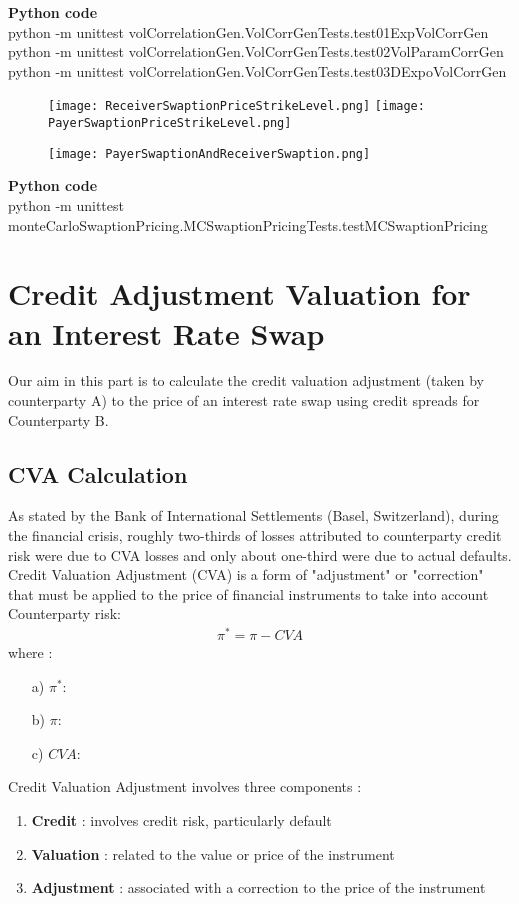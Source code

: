 \documentclass[11pt]{article}
\numberwithin{equation}{subsection}
\begin{document}
\textbf{Python code}\\
python -m unittest volCorrelationGen.VolCorrGenTests.test01ExpVolCorrGen\\
python -m unittest volCorrelationGen.VolCorrGenTests.test02VolParamCorrGen\\
python -m unittest volCorrelationGen.VolCorrGenTests.test03DExpoVolCorrGen

\begin{figure}[H]
	\texttt{[image: ReceiverSwaptionPriceStrikeLevel.png]}
	\texttt{[image: PayerSwaptionPriceStrikeLevel.png]}
\end{figure}


\begin{figure}[H]
	\texttt{[image: PayerSwaptionAndReceiverSwaption.png]}
\end{figure}

\textbf{Python code} \\
python -m unittest monteCarloSwaptionPricing.MCSwaptionPricingTests.testMCSwaptionPricing

\newpage
\section{Credit Adjustment Valuation for an Interest Rate Swap}
Our aim in this part is to calculate the credit valuation adjustment (taken by counterparty
A) to the price of an interest rate swap using credit spreads for Counterparty B.

\subsection{CVA Calculation}
As stated by the Bank of International Settlements (Basel, Switzerland), during the financial crisis, roughly two-thirds of losses attributed to counterparty credit risk were due to CVA losses and only about one-third were due to actual defaults.
Credit Valuation Adjustment (CVA) is a form of "adjustment" or "correction" that must be applied to the price of financial instruments to take into account Counterparty risk:
\begin{eqnarray*}
	\pi^{*}=\pi - CVA
\end{eqnarray*}
where :
\begin{enumerate}
	\item [a)] \(\pi^{*}\): \ 
	\item [b)] \(\pi\):  \ 
	\item [c)] \(CVA\):  \ 
\end{enumerate}
Credit Valuation Adjustment involves three components :
\begin{enumerate}
	\item \textbf{Credit} : involves credit risk, particularly default
	\item \textbf{Valuation} : related to the value or price of the instrument
	\item \textbf{Adjustment} : associated with a correction to the price of the instrument
\end{enumerate}
\end{document}
